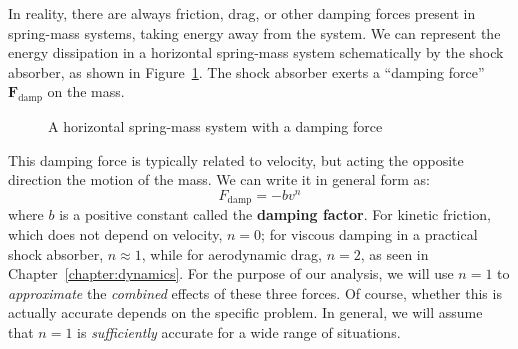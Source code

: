 In reality, there are always friction, drag, or other damping forces present in
spring-mass systems, taking energy away from the system. We can represent the
energy dissipation in a horizontal spring-mass system schematically by the shock
absorber, as shown in Figure~\ref{fig:damping1}. The shock absorber exerts a
``damping force'' $\bm F_\text{damp}$ on the mass.
\begin{figure}[ht]
  \centering
  \caption{A horizontal spring-mass system with a damping force}
  \label{fig:damping1}
\end{figure}
This damping force is typically related to velocity, but acting the opposite
direction the motion of the mass. We can write it in general form as:
\begin{equation}
  F_\text{damp}=-bv^n
\end{equation}
where $b$ is a positive constant called the \textbf{damping factor}. For
kinetic friction, which does not depend on velocity, $n=0$; for viscous damping
in a practical shock absorber, $n\approx 1$, while for aerodynamic drag, $n=2$,
as seen in Chapter~\ref{chapter:dynamics}. For the purpose of our analysis, we
will use $n=1$ to \emph{approximate} the \emph{combined} effects of these three
forces. Of course, whether this is actually accurate depends on the specific
problem. In general, we will assume that $n=1$ is \emph{sufficiently} accurate
for a wide range of situations.

